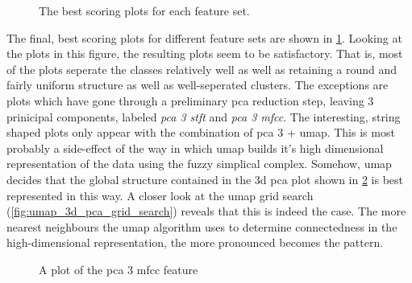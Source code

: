 \documentclass[11pt]{article}
\begin{document}
\begin{figure}[htbp]
\centering
{}
\caption{\label{fig:best_overall}The best scoring plots for each feature set.}
\end{figure}

The final, best scoring plots for different feature sets are shown in \ref{fig:best_overall}. Looking at the plots in this figure, the resulting plots seem to be satisfactory. That is, most of the plots seperate the classes relatively well as well as retaining a round and fairly uniform structure as well as well-seperated clusters. The exceptions are plots which have gone through a preliminary pca reduction step, leaving 3 prinicipal components, labeled \textit{pca 3 stft} and \textit{pca 3 mfcc}. The interesting, string shaped plots only appear with the combination of pca 3 + umap. This is most probably a side-effect of the way in which umap builds it's high dimensional representation of the data using the fuzzy simplical complex. Somehow, umap decides that the global structure contained in the 3d pca plot shown in \ref{fig:3d_pca} is best represented in this way. A closer look at the umap grid search (\ref{fig:umap_3d_pca_grid_search}) reveals that this is indeed the case. The more nearest neighbours the umap algorithm uses to determine connectedness in the high-dimensional representation, the more pronounced becomes the pattern.

\begin{figure}[hb]
\centering
{}
\caption{\label{fig:3d_pca}A plot of the pca 3 mfcc feature}
\end{figure}
\end{document}
